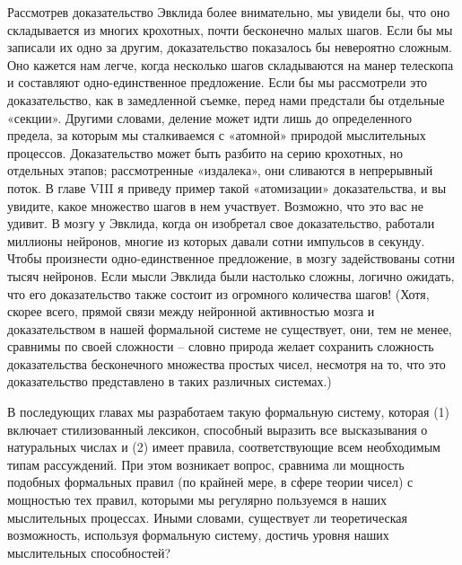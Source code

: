 \documentclass[../main.tex]{subfiles}
\begin{document}
Рассмотрев доказательство Эвклида более внимательно, мы увидели бы, что оно складывается из многих крохотных, почти бесконечно малых шагов. Если бы мы записали их одно за другим, доказательство показалось бы невероятно сложным. Оно кажется нам легче, когда несколько шагов складываются на манер телескопа и составляют одно-единственное предложение. Если бы мы рассмотрели это доказательство, как в замедленной съемке, перед нами предстали бы отдельные «секции». Другими словами, деление может идти лишь до определенного предела, за которым мы сталкиваемся с «атомной» природой мыслительных процессов. Доказательство может быть разбито на серию крохотных, но отдельных этапов; рассмотренные «издалека», они сливаются в непрерывный поток. В главе VIII я приведу пример такой «атомизации» доказательства, и вы увидите, какое множество шагов в нем участвует. Возможно, что это вас не удивит. В мозгу у Эвклида, когда он изобретал свое доказательство, работали миллионы нейронов, многие из которых давали сотни импульсов в секунду. Чтобы произнести одно-единственное предложение, в мозгу задействованы сотни тысяч нейронов. Если мысли Эвклида были настолько сложны, логично ожидать, что его доказательство также состоит из огромного количества шагов! (Хотя, скорее всего, прямой связи между нейронной активностью мозга и доказательством в нашей формальной системе не существует, они, тем не менее, сравнимы по своей сложности \--- словно природа желает сохранить сложность доказательства бесконечного множества простых чисел, несмотря на то, что это доказательство представлено в таких различных системах.)

В последующих главах мы разработаем такую формальную систему, которая (1) включает стилизованный лексикон, способный выразить все высказывания о натуральных числах и (2) имеет правила, соответствующие всем необходимым типам рассуждений. При этом возникает вопрос, сравнима ли мощность подобных формальных правил (по крайней мере, в сфере теории чисел) с мощностью тех правил, которыми мы регулярно пользуемся в наших мыслительных процессах. Иными словами, существует ли теоретическая возможность, используя формальную систему, достичь уровня наших мыслительных способностей?
\end{document}
